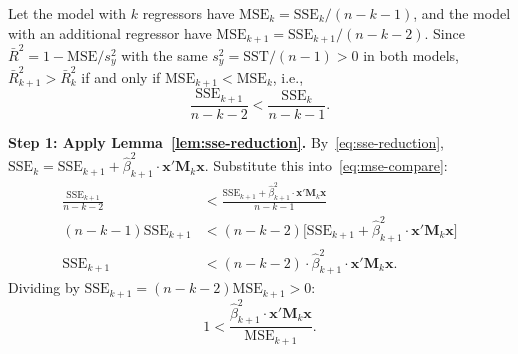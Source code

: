 \documentclass[12pt,a4paper]{article}
\makeatletter
\theoremstyle{definition}
\renewenvironment{proof}[1][\proofname]{\par
  \pushQED{\qed}%
  \normalfont \topsep6\p@\@plus6\p@\relax
  \trivlist
  \item[\hskip\labelsep\bfseries #1\@addpunct{.}]\ignorespaces
}{%
  \popQED\endtrivlist\@endpefalse
}
\newcommand{\SST}{\mathrm{SST}}
\newcommand{\SSE}{\mathrm{SSE}}
\newcommand{\MSE}{\mathrm{MSE}}
\newcommand{\bx}{\mathbf{x}}
\newcommand{\bM}{\mathbf{M}}
\makeatother
\begin{document}
\begin{proof}
Let the model with $k$ regressors have $\MSE_k = \SSE_k/(n-k-1)$, and the model with an additional regressor have $\MSE_{k+1} = \SSE_{k+1}/(n-k-2)$. Since $\bar{R}^2 = 1 - \MSE/s_y^2$ with the same $s_y^2 = \SST/(n-1) > 0$ in both models, $\bar{R}^2_{k+1} > \bar{R}^2_k$ if and only if $\MSE_{k+1} < \MSE_k$, i.e.,
\begin{equation}\label{eq:mse-compare}
\frac{\SSE_{k+1}}{n-k-2} < \frac{\SSE_k}{n-k-1}.
\end{equation}

\textbf{Step 1: Apply Lemma~\ref{lem:sse-reduction}.}
By~\eqref{eq:sse-reduction}, $\SSE_k = \SSE_{k+1} + \hat{\beta}_{k+1}^2\cdot\bx'\bM_k\bx$. Substitute this into~\eqref{eq:mse-compare}:
\begin{align*}
\frac{\SSE_{k+1}}{n-k-2} &< \frac{\SSE_{k+1} + \hat{\beta}_{k+1}^2\cdot\bx'\bM_k\bx}{n-k-1}\\
(n-k-1)\SSE_{k+1} &< (n-k-2)\bigl[\SSE_{k+1} + \hat{\beta}_{k+1}^2\cdot\bx'\bM_k\bx\bigr]\\
\SSE_{k+1} &< (n-k-2)\cdot\hat{\beta}_{k+1}^2\cdot\bx'\bM_k\bx.
\end{align*}
Dividing by $\SSE_{k+1} = (n-k-2)\MSE_{k+1} > 0$:
\begin{equation}\label{eq:mse-simplified}
1 < \frac{\hat{\beta}_{k+1}^2\cdot\bx'\bM_k\bx}{\MSE_{k+1}}.
\end{equation}


\end{proof}
\end{document}
